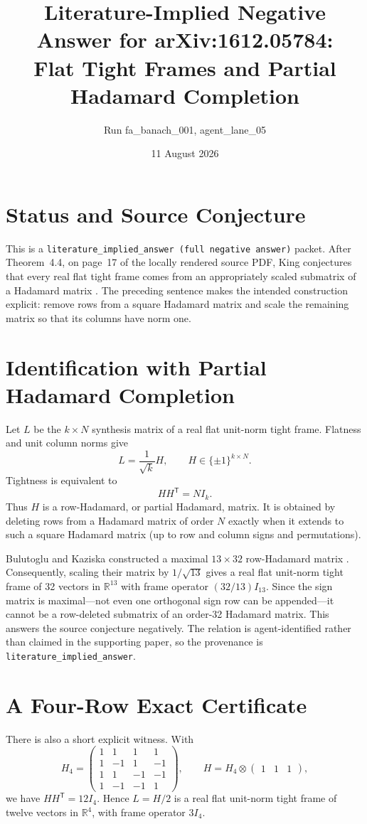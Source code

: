 \documentclass[11pt]{article}
\title{Literature-Implied Negative Answer for arXiv:1612.05784:\\
Flat Tight Frames and Partial Hadamard Completion}
\author{Run fa\_banach\_001, agent\_lane\_05}
\date{11 August 2026}
\begin{document}
\maketitle

\section*{Status and Source Conjecture}

This is a \texttt{literature\_implied\_answer (full negative answer)} packet.
After Theorem~4.4, on page~17 of the locally rendered source PDF, King
conjectures that every real flat tight frame comes from an appropriately scaled
submatrix of a Hadamard matrix \cite{King}.  The preceding sentence makes the
intended construction explicit: remove rows from a square Hadamard matrix and
scale the remaining matrix so that its columns have norm one.

\section*{Identification with Partial Hadamard Completion}

Let $L$ be the $k\times N$ synthesis matrix of a real flat unit-norm tight
frame.  Flatness and unit column norms give
\[
 L=\frac1{\sqrt{k}}H,\qquad H\in\{\pm1\}^{k\times N}.
\]
Tightness is equivalent to
\[
 HH^{\mathsf T}=NI_k.
\]
Thus $H$ is a row-Hadamard, or partial Hadamard, matrix.  It is obtained by
deleting rows from a Hadamard matrix of order $N$ exactly when it extends to
such a square Hadamard matrix (up to row and column signs and permutations).

Bulutoglu and Kaziska constructed a maximal $13\times32$ row-Hadamard matrix
\cite{BK}.  Consequently, scaling their matrix by $1/\sqrt{13}$ gives a real
flat unit-norm tight frame of 32 vectors in $\mathbb R^{13}$ with frame
operator $(32/13)I_{13}$.  Since the sign matrix is maximal---not even one
orthogonal sign row can be appended---it cannot be a row-deleted submatrix of
an order-32 Hadamard matrix.  This answers the source conjecture negatively.
The relation is agent-identified rather than claimed in the supporting paper,
so the provenance is \texttt{literature\_implied\_answer}.

\section*{A Four-Row Exact Certificate}

There is also a short explicit witness.  With
\[
 H_4=\begin{pmatrix}
 1&1&1&1\\
 1&-1&1&-1\\
 1&1&-1&-1\\
 1&-1&-1&1
 \end{pmatrix},
 \qquad H=H_4\otimes\begin{pmatrix}1&1&1\end{pmatrix},
\]
we have $HH^{\mathsf T}=12I_4$.  Hence $L=H/2$ is a real flat unit-norm
tight frame of twelve vectors in $\mathbb R^4$, with frame operator $3I_4$.
\end{document}
